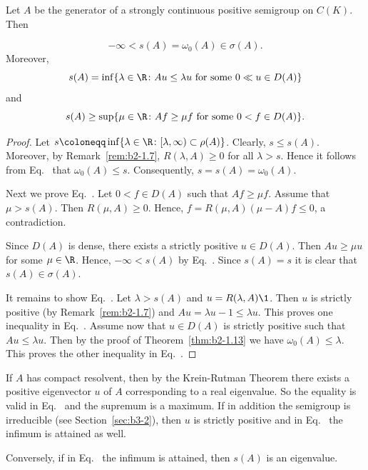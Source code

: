 \begin{corollary}\label{cor:b2-1.14}
Let $A$ be the generator of a strongly continuous positive semigroup on $C(K)$.
Then

\begin{equation}\label{eq:b2-1.7}
-\infty < s(A) = \omega_{0}(A) \in \sigma(A).
\end{equation}
Moreover,
\begin{equation}\label{eq:b2-1.8}
s(A) = \inf\{\lambda \in \R \colon Au \leq \lambda u \text{ for some } 0 \ll u \in D(A)\}
\end{equation}
and
\begin{equation}\label{eq:b2-1.9}
s(A) \geq \sup\{\mu \in \R \colon Af \geq \mu f \text{ for some } 0 < f \in D(A)\}.
\end{equation}
\end{corollary}
\begin{proof}
Let $s \coloneqq \inf\{\lambda \in \R \colon [\lambda,\infty) \subset \rho(A)\}$.
Clearly, $s \leq s(A)$.
Moreover, by Remark~\ref{rem:b2-1.7}, $R(\lambda,A) \geq 0$ for all $\lambda > s$.
Hence it follows from Eq.~ that $\omega_{0}(A) \leq s$.
Consequently, $s = s(A) = \omega_{0}(A)$.

Next we prove Eq.~.
Let $0 < f \in D(A)$ such that $Af \geq \mu f$.
Assume that $\mu > s(A)$.
Then $R(\mu,A) \geq 0$.
Hence, $f = R(\mu,A)(\mu-A)f \leq 0$, a contradiction.

Since $D(A)$ is dense, there exists a strictly positive $u \in D(A)$.
Then $Au \geq \mu u$ for some $\mu \in \R$.
Hence, $-\infty < s(A)$ by Eq.~. 
Since $s(A) = s$ it is clear that $s(A) \in \sigma(A)$.

It remains to show Eq.~. 
Let $\lambda > s(A)$ and $u = R(\lambda,A)\1$.
Then $u$ is strictly positive (by  Remark~\ref{rem:b2-1.7}) and $Au = \lambda u - 1 \leq \lambda u$.
This proves one inequality in Eq.~. 
Assume now that $u \in D(A)$ is strictly positive such that $Au \leq \lambda u$.
Then by the proof of Theorem~\ref{thm:b2-1.13} we have $\omega_{0}(A) \leq \lambda$.
This proves the other inequality in Eq.~. 
\end{proof}
\begin{remark}\label{rem:b2-1.15}
If\/ $A$ has compact resolvent, then by the Krein-Rutman Theorem there exists a positive eigenvector $u$ of\/ $A$ corresponding to a real eigenvalue.
So the equality is valid in Eq.~  
and the supremum is a maximum.
If in addition the semigroup is irreducible (see Section~\ref{sec:b3-2}), then $u$ is strictly positive and in Eq.~ 
the infimum is attained as well.

Conversely, if in Eq.~ 
the infimum is attained, then $s(A)$ is an eigenvalue.
\end{remark}
